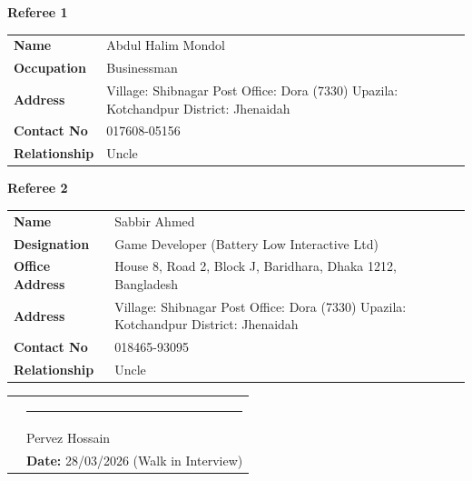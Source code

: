 \documentclass[a4paper,11pt]{article}
\begin{document}
\noindent
\begin{minipage}[t]{0.48\textwidth}
  \begin{mdframed}[
      linecolor=bordergray,
      linewidth=0.6pt,
      innerleftmargin=8pt,
      innerrightmargin=8pt,
      innertopmargin=8pt,
      innerbottommargin=8pt
    ]
    {\bfseries Referee 1}\\[4pt]
    \begin{tabular}{@{}L{2.8cm} L{4.5cm}@{}}
      \textbf{Name}         & Abdul Halim Mondol \\
      \textbf{Occupation}   & Businessman \\
      \textbf{Address}      & Village: Shibnagar Post Office: Dora (7330) \newline
                              Upazila: Kotchandpur District: Jhenaidah \\
      \textbf{Contact No}   & 017608-05156 \\
      \textbf{Relationship} & Uncle \\
    \end{tabular}
  \end{mdframed}
\end{minipage}
\hfill
\begin{minipage}[t]{0.48\textwidth}
  \begin{mdframed}[
      linecolor=bordergray,
      linewidth=0.6pt,
      innerleftmargin=8pt,
      innerrightmargin=8pt,
      innertopmargin=8pt,
      innerbottommargin=8pt
    ]
    {\bfseries Referee 2}\\[4pt]
    \begin{tabular}{@{}L{2.8cm} L{4.5cm}@{}}
      \textbf{Name}          & Sabbir Ahmed \\
      \textbf{Designation}   & Game Developer \newline (Battery Low Interactive Ltd) \\
      \textbf{Office Address}& House 8, Road 2, Block J, \newline Baridhara, Dhaka 1212, Bangladesh \\
      \textbf{Address}       & Village: Shibnagar Post Office: Dora (7330) \newline
                               Upazila: Kotchandpur District: Jhenaidah \\
      \textbf{Contact No}    & 018465-93095 \\
      \textbf{Relationship}  & Uncle \\
    \end{tabular}
  \end{mdframed}
\end{minipage}

\vspace{30pt}

\noindent
\begin{tabular}{@{}p{10cm} p{7cm}@{}}
  & \rule{5cm}{0.4pt} \\
  & Pervez Hossain \\[4pt]
  & \textbf{Date:} 28/03/2026 (Walk in Interview) \\
\end{tabular}
\end{document}
